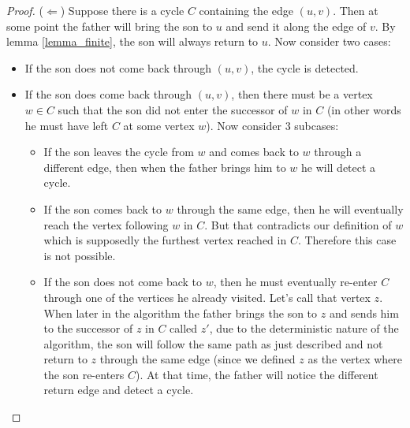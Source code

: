 \documentclass{article}
\begin{document}
\begin{enumerate}
\begin{proof}
($\Longleftarrow$) Suppose there is a cycle $C$ containing the edge $(u,v)$. Then at some point the father will bring the son to $u$ and send it along the edge of $v$. By lemma \ref{lemma_finite}, the son will always return to $u$. Now consider two cases:
\begin{itemize}
\item If the son does not come back through $(u,v)$, the cycle is detected.
\item If the son does come back through $(u,v)$, then there must be a vertex $w \in C$ such that the son did not enter the successor of $w$ in $C$ (in other words he must have left $C$ at some vertex $w$). Now consider 3 subcases:
\begin{itemize}
\item If the son leaves the cycle from $w$ and comes back to $w$ through a different edge, then when the father brings him to $w$ he will detect a cycle.
\item If the son comes back to $w$ through the same edge, then he will eventually reach the vertex following $w$ in $C$. But that contradicts our definition of $w$ which is supposedly the furthest vertex reached in $C$. Therefore this case is not possible. %
\item If the son does not come back to $w$, then he must eventually re-enter $C$ through one of the vertices he already visited. Let's call that vertex $z$. When later in the algorithm the father brings the son to $z$ and sends him to the successor of $z$ in $C$ called $z'$, due to the deterministic nature of the algorithm, the son will follow the same path as just described and not return to $z$ through the same edge (since we defined $z$ as the vertex where the son re-enters $C$). At that time, the father will notice the different return edge and detect a cycle.
\end{itemize}
\end{itemize}

\begin{figure}[!h]
\centering
{}
\end{figure}
\end{proof}
\end{enumerate}
\end{document}

